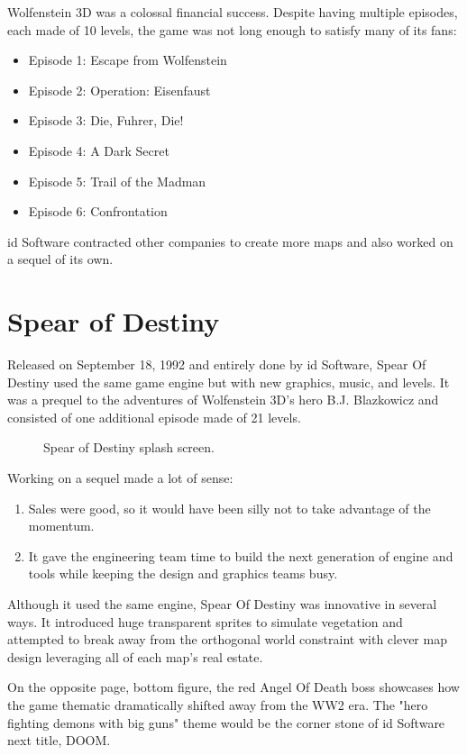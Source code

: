 \documentclass[book.tex]{subfiles}
\begin{document}
Wolfenstein 3D was a colossal financial success. Despite having multiple episodes, each made of 10 levels, the game was not long enough to satisfy many of its fans:\\
\par
\begin{itemize}
\item Episode 1: Escape from Wolfenstein
\item Episode 2: Operation: Eisenfaust
\item Episode 3: Die, Fuhrer, Die!
\item Episode 4: A Dark Secret
\item Episode 5: Trail of the Madman
\item Episode 6: Confrontation
\end{itemize}
id Software contracted other companies to create more maps and also worked on a sequel of its own.

\section{Spear of Destiny}
Released on September 18, 1992 and entirely done by id Software, Spear Of Destiny used the same game engine but with new graphics, music, and levels. It was a prequel to the adventures of Wolfenstein 3D's hero B.J. Blazkowicz and consisted of one additional episode made of 21 levels.\\
   \par
\begin{figure}[H]
\centering
 \caption{Spear of Destiny splash screen.}
 \end{figure}
 \par
 Working on a sequel made a lot of sense:
 \begin{enumerate}
 \item Sales were good, so it would have been silly not to take advantage of the momentum.
 \item It gave the engineering team time to build the next generation of engine and tools while keeping the design and graphics teams busy.
 \end{enumerate}
Although it used the same engine, Spear Of Destiny was innovative in several ways. It introduced huge transparent sprites to simulate vegetation and attempted to break away from the orthogonal world constraint with clever map design leveraging all of each map's real estate.\\
    \par
On the opposite page, bottom figure, the red Angel Of Death boss showcases how the game thematic dramatically shifted away from the WW2 era. The "hero fighting demons with big guns" theme would be the corner stone of id Software next title, DOOM. 
\begin{figure}[H]
\centering
 \end{figure}
 \par
 \begin{figure}[H]
\centering
 \end{figure}
\end{document}
